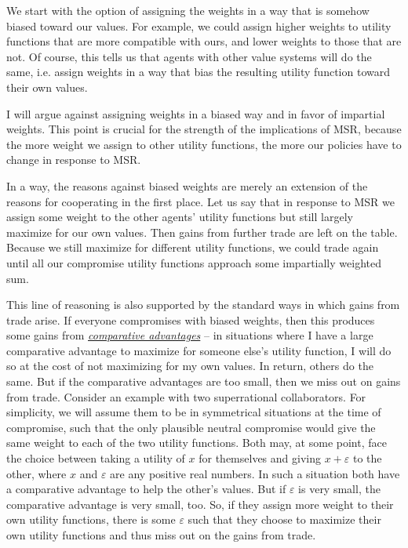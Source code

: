 We start with the option of assigning the weights in a way that is
somehow biased toward our values. For example, we could assign higher
weights to utility functions that are more compatible with ours, and
lower weights to those that are not. Of course, this tells us that
agents with other value systems will do the same, i.e. assign weights in
a way that bias the resulting utility function toward their own values.

I will argue against assigning weights in a biased way and in favor of
impartial weights. This point is crucial for the strength of the
implications of MSR, because the more weight we assign to other utility
functions, the more our policies have to change in response to MSR.

In a way, the reasons against biased weights are merely an extension of
the reasons for cooperating in the first place. Let us say that in
response to MSR we assign some weight to the other agents' utility
functions but still largely maximize for our own values. Then gains from
further trade are left on the table. Because we still maximize for
different utility functions, we could trade again until all our
compromise utility functions approach some impartially weighted sum.

This line of reasoning is also supported by the standard ways in which
gains from trade arise. If everyone compromises with biased weights,
then this produces some gains from
\href{https://en.wikipedia.org/wiki/Comparative_advantage}{\emph{comparative
advantages}} -- in situations where I have a large comparative advantage
to maximize for someone else's utility function, I will do so at the
cost of not maximizing for my own values. In return, others do the same.
But if the comparative advantages are too small, then we miss out on
gains from trade. Consider an example with two superrational
collaborators. For simplicity, we will assume them to be in symmetrical
situations at the time of compromise, such that the only plausible
neutral compromise would give the same weight to each of the two utility
functions. Both may, at some point, face the choice between taking a
utility of \(x\) for themselves and giving \(x + \varepsilon\) to the
other, where \(x\) and \(\varepsilon\) are any positive real numbers. In
such a situation both have a comparative advantage to help the other's
values. But if \(\varepsilon\) is very small, the comparative advantage
is very small, too. So, if they assign more weight to their own utility
functions, there is some \(\varepsilon\) such that they choose to
maximize their own utility functions and thus miss out on the gains from
trade.

